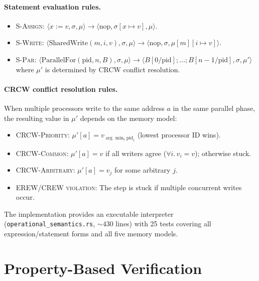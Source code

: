\documentclass[11pt]{article}
\begin{document}
\paragraph{Statement evaluation rules.}
\begin{itemize}[leftmargin=*]
\item \textsc{S-Assign}: $\langle x := v, \sigma, \mu \rangle \to \langle \text{nop}, \sigma[x \mapsto v], \mu \rangle$.
\item \textsc{S-Write}: $\langle \text{SharedWrite}(m, i, v), \sigma, \mu \rangle \to \langle \text{nop}, \sigma, \mu[m][i \mapsto v] \rangle$.
\item \textsc{S-Par}: $\langle \text{ParallelFor}(\text{pid}, n, B), \sigma, \mu \rangle \to \langle B[0/\text{pid}]; \ldots; B[n{-}1/\text{pid}], \sigma, \mu' \rangle$ where $\mu'$ is determined by CRCW conflict resolution.
\end{itemize}

\paragraph{CRCW conflict resolution rules.}
When multiple processors write to the same address $a$ in the same parallel
phase, the resulting value in $\mu'$ depends on the memory model:
\begin{itemize}
\item \textsc{CRCW-Priority}: $\mu'[a] = v_{\arg\min_i \text{pid}_i}$ (lowest processor ID wins).
\item \textsc{CRCW-Common}: $\mu'[a] = v$ if all writers agree ($\forall i.\, v_i = v$); otherwise stuck.
\item \textsc{CRCW-Arbitrary}: $\mu'[a] = v_j$ for some arbitrary $j$.
\item \textsc{EREW/CREW violation}: The step is stuck if multiple concurrent writes occur.
\end{itemize}

The implementation provides an executable interpreter (\texttt{operational\_semantics.rs},
${\sim}430$ lines) with 25 tests covering all expression/statement forms and
all five memory models.

\section{Property-Based Verification}
\label{sec:verification}
\end{document}
